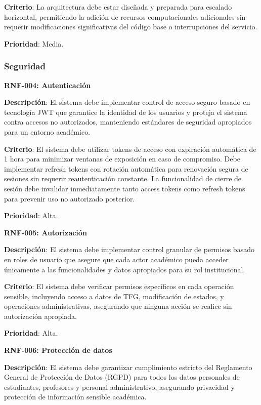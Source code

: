 \documentclass[12pt,a4paper,oneside]{report}
\begin{document}
\textbf{Criterio}: La arquitectura debe estar diseñada y preparada para escalado horizontal, permitiendo la adición de recursos computacionales adicionales sin requerir modificaciones significativas del código base o interrupciones del servicio.

\textbf{Prioridad}: Media.

\subsubsection{Seguridad}\label{seguridad}

\textbf{RNF-004: Autenticación}

\textbf{Descripción}: El sistema debe implementar control de acceso seguro basado en tecnología JWT que garantice la identidad de los usuarios y proteja el sistema contra accesos no autorizados, manteniendo estándares de seguridad apropiados para un entorno académico.

\textbf{Criterio}: El sistema debe utilizar tokens de acceso con expiración automática de 1 hora para minimizar ventanas de exposición en caso de compromiso. Debe implementar refresh tokens con rotación automática para renovación segura de sesiones sin requerir reautenticación constante. La funcionalidad de cierre de sesión debe invalidar inmediatamente tanto access tokens como refresh tokens para prevenir uso no autorizado posterior.

\textbf{Prioridad}: Alta.

\textbf{RNF-005: Autorización}

\textbf{Descripción}: El sistema debe implementar control granular de permisos basado en roles de usuario que asegure que cada actor académico pueda acceder únicamente a las funcionalidades y datos apropiados para su rol institucional.

\textbf{Criterio}: El sistema debe verificar permisos específicos en cada operación sensible, incluyendo acceso a datos de TFG, modificación de estados, y operaciones administrativas, asegurando que ninguna acción se realice sin autorización apropiada.

\textbf{Prioridad}: Alta.

\textbf{RNF-006: Protección de datos}

\textbf{Descripción}: El sistema debe garantizar cumplimiento estricto del Reglamento General de Protección de Datos (RGPD) para todos los datos personales de estudiantes, profesores y personal administrativo, asegurando privacidad y protección de información sensible académica.
\end{document}
